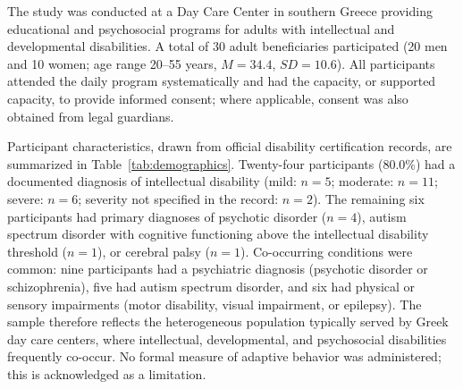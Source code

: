 \documentclass[12pt,a4paper]{article}
\begin{document}
The study was conducted at a Day Care Center in southern Greece providing educational and psychosocial programs for adults with intellectual and developmental disabilities. A total of 30 adult beneficiaries participated (20 men and 10 women; age range 20--55 years, $M = 34.4$, $SD = 10.6$). All participants attended the daily program systematically and had the capacity, or supported capacity, to provide informed consent; where applicable, consent was also obtained from legal guardians.

Participant characteristics, drawn from official disability certification records, are summarized in Table~\ref{tab:demographics}. Twenty-four participants (80.0\%) had a documented diagnosis of intellectual disability (mild: $n = 5$; moderate: $n = 11$; severe: $n = 6$; severity not specified in the record: $n = 2$). The remaining six participants had primary diagnoses of psychotic disorder ($n = 4$), autism spectrum disorder with cognitive functioning above the intellectual disability threshold ($n = 1$), or cerebral palsy ($n = 1$). Co-occurring conditions were common: nine participants had a psychiatric diagnosis (psychotic disorder or schizophrenia), five had autism spectrum disorder, and six had physical or sensory impairments (motor disability, visual impairment, or epilepsy). The sample therefore reflects the heterogeneous population typically served by Greek day care centers, where intellectual, developmental, and psychosocial disabilities frequently co-occur. No formal measure of adaptive behavior was administered; this is acknowledged as a limitation.
\end{document}
